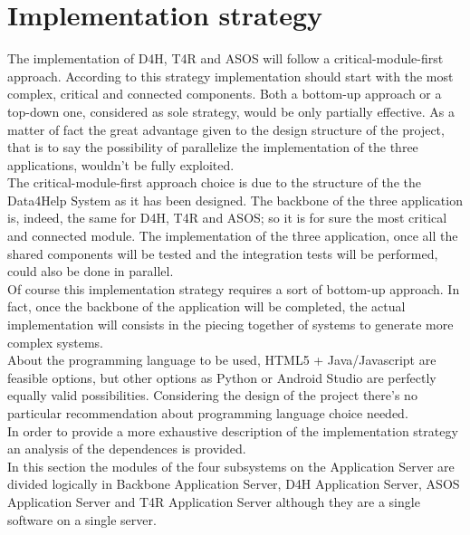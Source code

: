 
\section{Implementation strategy }

The implementation of D4H, T4R and ASOS will follow a critical-module-first approach. According to this strategy implementation should start with the most complex, critical and connected components. Both a bottom-up approach or a top-down one, considered as sole strategy, would be only partially effective. As a matter of fact the great advantage given to the design structure of the project, that is to say the possibility of parallelize the implementation of the three applications, wouldn't be fully exploited.\\ The critical-module-first approach choice is due to the structure of the the Data4Help System as it has been designed. The backbone of the three application is, indeed, the same for D4H, T4R and ASOS; so it is for sure the most critical and connected module. The implementation of the three application, once all the shared components will be tested and the integration tests will be performed, could also be done in parallel. \\ Of course this implementation strategy requires a sort of bottom-up approach. In fact, once the backbone of the application will be completed, the actual implementation will consists in the piecing together of systems to generate more complex systems. \\ About the programming language to be used, HTML5 + Java/Javascript are feasible options, but other options as Python or Android Studio are perfectly equally valid possibilities. Considering the design of the project there's no particular recommendation about programming language choice needed. \\ In order to provide a more exhaustive description of the implementation strategy an analysis of the dependences is provided. \\
In this section the modules of the four subsystems on the Application Server are divided logically in Backbone Application Server, D4H Application Server, ASOS Application Server and T4R Application Server although they are a single software on a single server.
